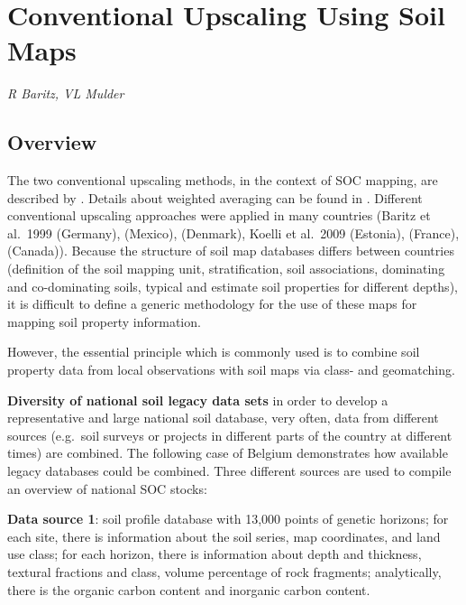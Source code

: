 \documentclass[10pt,b5paper,]{book}
\theoremstyle{definition}
\theoremstyle{definition}
\theoremstyle{definition}
\theoremstyle{remark}
\begin{document}
\hypertarget{conventional-upscaling-using-soil-maps}{%
\section{Conventional Upscaling Using Soil
Maps}\label{conventional-upscaling-using-soil-maps}}

\emph{R Baritz, VL Mulder}

\hypertarget{overview}{%
\subsection{Overview}\label{overview}}

The two conventional upscaling methods, in the context of SOC mapping,
are described by \cite{lettens2004soil}. Details about weighted
averaging can be found in \cite{hiederer2013mapping}. Different
conventional upscaling approaches were applied in many countries (Baritz
et al.~1999 (Germany), \cite{krasilnikov2013soils} (Mexico),
\cite{greve2007generating} (Denmark), Koelli et al.~2009 (Estonia),
\cite{arrouays2001carbon} (France), \cite{bhatti2002estimates}
(Canada)). Because the structure of soil map databases differs between
countries (definition of the soil mapping unit, stratification, soil
associations, dominating and co-dominating soils, typical and estimate
soil properties for different depths), it is difficult to define a
generic methodology for the use of these maps for mapping soil property
information.

However, the essential principle which is commonly used is to combine
soil property data from local observations with soil maps via class- and
geomatching.

\textbf{Diversity of national soil legacy data sets} in order to develop
a representative and large national soil database, very often, data from
different sources (e.g.~soil surveys or projects in different parts of
the country at different times) are combined. The following case of
Belgium demonstrates how available legacy databases could be combined.
Three different sources are used to compile an overview of national SOC
stocks:

\textbf{Data source 1}: soil profile database with 13,000 points of
genetic horizons; for each site, there is information about the soil
series, map coordinates, and land use class; for each horizon, there is
information about depth and thickness, textural fractions and class,
volume percentage of rock fragments; analytically, there is the organic
carbon content and inorganic carbon content.
\end{document}
